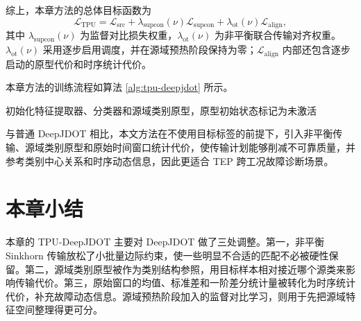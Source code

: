 \documentclass{seuthesis-2022}
\begin{document}
综上，本章方法的总体目标函数为
\begin{equation}
    \mathcal{L}_{\mathrm{TPU}}
    =
    \mathcal{L}_{\mathrm{src}}
    +
    \lambda_{\mathrm{supcon}}(\nu)\mathcal{L}_{\mathrm{supcon}}
    +
    \lambda_{\mathrm{ot}}(\nu)\mathcal{L}_{\mathrm{align}},
\end{equation}
其中 $\lambda_{\mathrm{supcon}}(\nu)$ 为监督对比损失权重，$\lambda_{\mathrm{ot}}(\nu)$ 为非平衡联合传输对齐权重。$\lambda_{\mathrm{ot}}(\nu)$ 采用逐步启用调度，并在源域预热阶段保持为零；$\mathcal{L}_{\mathrm{align}}$ 内部还包含逐步启动的原型代价和时序统计代价。

本章方法的训练流程如算法 \ref{alg:tpu-deepjdot} 所示。
\begin{algorithm}[!htbp]
    \caption{时序原型非平衡联合分布对齐训练流程}
    \label{alg:tpu-deepjdot}
    初始化特征提取器、分类器和源域类别原型，原型初始状态标记为未激活\;
\end{algorithm}

与普通 DeepJDOT 相比，本文方法在不使用目标标签的前提下，引入非平衡传输、源域类别原型和原始时间窗口统计代价，使传输计划能够削减不可靠质量，并参考类别中心关系和时序动态信息，因此更适合 TEP 跨工况故障诊断场景。

\section{本章小结}

本章的 TPU-DeepJDOT 主要对 DeepJDOT 做了三处调整。第一，非平衡 Sinkhorn 传输放松了小批量边际约束，使一些明显不合适的匹配不必被硬性保留。第二，源域类别原型被作为类别结构参照，用目标样本相对接近哪个源类来影响传输代价。第三，原始窗口的均值、标准差和一阶差分统计量被转化为时序统计代价，补充故障动态信息。源域预热阶段加入的监督对比学习，则用于先把源域特征空间整理得更可分。
\end{document}
